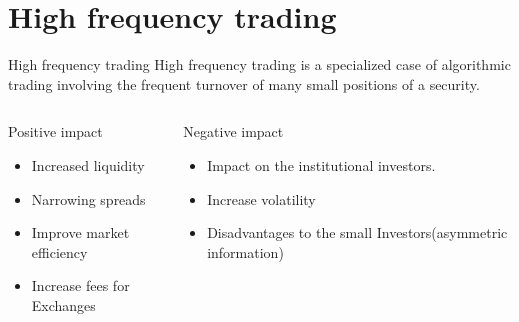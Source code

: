 \documentclass[xcolor={x11names,svgnames,dvipsnames}]{beamer}
\begin{document}
\section{High frequency trading}
\begin{frame}


\begin{block}{High frequency trading}
High frequency trading is a specialized case of algorithmic trading involving the \alert{frequent turnover} of many \alert{small positions} of a security.
\end{block}

\begin{columns}
\column{2.3in}
\begin{block}{Positive impact }
\begin{itemize}
\item Increased liquidity
\item Narrowing spreads
\item Improve market efficiency
\item Increase fees for Exchanges  
\end{itemize}
\end{block}

\column{2.3in}
\begin{block}{Negative impact }
\begin{itemize}
\item Impact on the institutional investors.
\item Increase volatility 
\item Disadvantages to the small Investors(\alert{asymmetric information})
\end{itemize}
\end{block}
\end{columns}

\end{frame}
%
%
%
\end{document}
